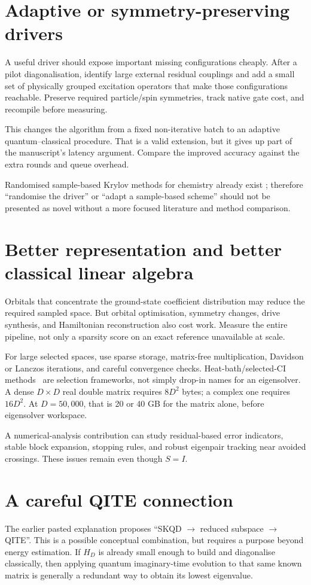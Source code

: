\documentclass[11pt,a4paper,oneside]{report}
\begin{document}
\section{Adaptive or symmetry-preserving drivers}
A useful driver should expose important missing configurations cheaply. After a pilot diagonalisation, identify large external residual couplings and add a small set of physically grouped excitation operators that make those configurations reachable. Preserve required particle/spin symmetries, track native gate cost, and recompile before measuring.

This changes the algorithm from a fixed non-iterative batch to an adaptive quantum--classical procedure. That is a valid extension, but it gives up part of the manuscript's latency argument. Compare the improved accuracy against the extra rounds and queue overhead.

Randomised sample-based Krylov methods for chemistry already exist \cite{piccinelli}; therefore ``randomise the driver'' or ``adapt a sample-based scheme'' should not be presented as novel without a more focused literature and method comparison.

\section{Better representation and better classical linear algebra}
Orbitals that concentrate the ground-state coefficient distribution may reduce the required sampled space. But orbital optimisation, symmetry changes, drive synthesis, and Hamiltonian reconstruction also cost work. Measure the entire pipeline, not only a sparsity score on an exact reference unavailable at scale.

For large selected spaces, use sparse storage, matrix-free multiplication, Davidson or Lanczos iterations, and careful convergence checks. Heat-bath/selected-CI methods~\cite{holmes} are selection frameworks, not simply drop-in names for an eigensolver. A dense $D\times D$ real double matrix requires $8D^2$ bytes; a complex one requires $16D^2$. At $D=50{,}000$, that is 20 or 40 GB for the matrix alone, before eigensolver workspace.

A numerical-analysis contribution can study residual-based error indicators, stable block expansion, stopping rules, and robust eigenpair tracking near avoided crossings. These issues remain even though $S=I$.

\section{A careful QITE connection}
The earlier pasted explanation proposes ``SKQD $\to$ reduced subspace $\to$ QITE''. This is a possible conceptual combination, but requires a purpose beyond energy estimation. If $H_D$ is already small enough to build and diagonalise classically, then applying quantum imaginary-time evolution to that same known matrix is generally a redundant way to obtain its lowest eigenvalue.
\end{document}
